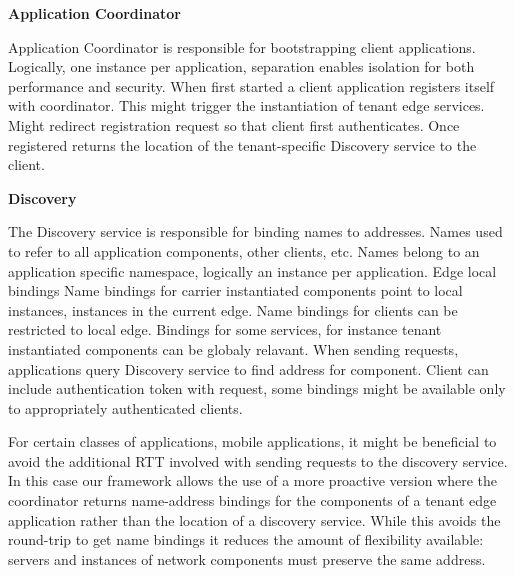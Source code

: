{\textbf{Application Coordinator}\\
\begin{outline}
\1 Application Coordinator is responsible for bootstrapping client applications.
    \2 Logically, one instance per application, separation enables isolation for both performance and security.
    \2 When first started a client application registers itself with coordinator.
    \2 This might trigger the instantiation of tenant edge services.
    \2 Might redirect registration request so that client first authenticates.
    \2 Once registered returns the location of the tenant-specific Discovery service to the client.
\end{outline}

\textbf{Discovery}\\
\begin{outline}
\1 The Discovery service is responsible for binding names to addresses.
    \2 Names used to refer to all application components, other clients, etc.
    \2 Names belong to an application specific namespace, logically an instance per application.
\1 Edge local bindings
    \2 Name bindings for carrier instantiated components point to local instances, \ie instances in the current edge.
    \2 Name bindings for clients can be restricted to local edge.
    \2 Bindings for some services, for instance tenant instantiated components can be globaly relavant.
\2 When sending requests, applications query Discovery service to find address for component.
\2 Client can include authentication token with request, some bindings might be available only to appropriately authenticated clients.
\end{outline}

\begin{outline}
\1 For certain classes of applications, \eg mobile applications, it might be beneficial to avoid the additional RTT involved with sending requests to
   the discovery service.
    \2 In this case our framework allows the use of a more proactive version where the coordinator returns name-address bindings for the components of
       a tenant edge application rather than the location of a discovery service.
    \2 While this avoids the round-trip to get name bindings it reduces the amount of flexibility available: servers and instances of network components
    must preserve the same address.
\end{outline}
}


